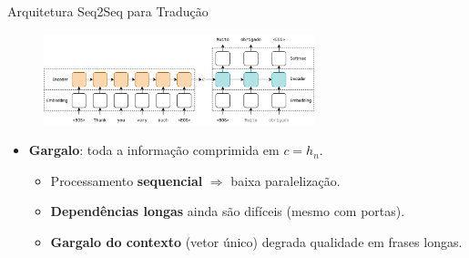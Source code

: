 \documentclass{beamer}
\begin{document}
\begin{frame}{Arquitetura Seq2Seq para Tradução}
	\begin{figure}
		\centering
		\includegraphics[width=0.7\textwidth]{assets/Seq2Seq_NMT.png}
	\end{figure}
	\begin{itemize}
		\item \textbf{Gargalo}: toda a informação comprimida em $c=h_n$.
		\begin{itemize}
			\item Processamento \textbf{sequencial} $\Rightarrow$ baixa paralelização.
			\item \textbf{Dependências longas} ainda são difíceis (mesmo com portas).
			\item \textbf{Gargalo do contexto} (vetor único) degrada qualidade em frases longas.
		\end{itemize}
	\end{itemize}
\end{frame}
\end{document}
